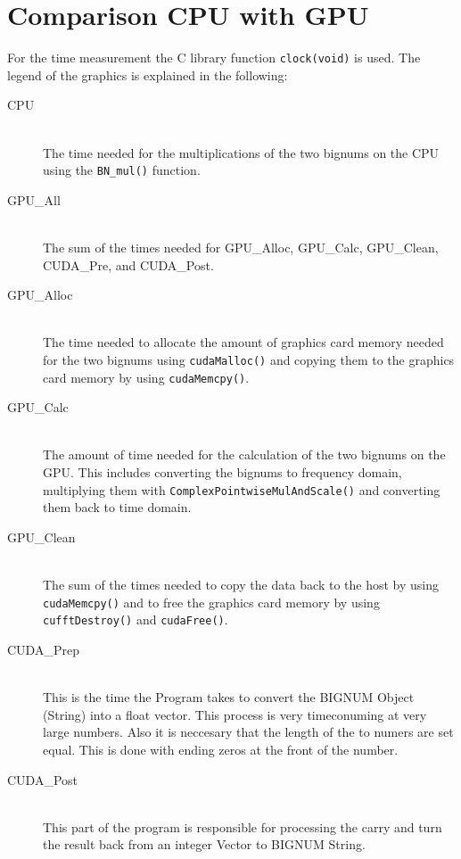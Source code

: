 \documentclass[12pt,a4paper]{article}
\begin{document}
\section{Comparison CPU with GPU}
For the time measurement the C library function \texttt{clock(void)} is used. The legend of the graphics is explained in the following:
\begin{description}
\item[CPU]\hfill \\
The time needed for the multiplications of the two bignums on the CPU using the \texttt{BN_mul()} function.
\item[GPU\_All]\hfill \\ 
The sum of the times needed for GPU\_Alloc, GPU\_Calc, GPU\_Clean, CUDA\_Pre, and CUDA\_Post.
\item[GPU\_Alloc]\hfill \\ 
The time needed to allocate the amount of graphics card memory needed for the two bignums using \texttt{cudaMalloc()} and copying them to the graphics card memory by using \texttt{cudaMemcpy()}.
\item[GPU\_Calc]\hfill \\ 
The amount of time needed for the calculation of the two bignums on the GPU. This includes converting the bignums to frequency domain, multiplying them with \texttt{ComplexPointwiseMulAndScale()} and converting them back to time domain.
\item[GPU\_Clean]\hfill \\ 
The sum of the times needed to copy the data back to the host by using \texttt{cudaMemcpy()} and to free the graphics card memory by using \texttt{cufftDestroy()} and \texttt{cudaFree()}.
\item[CUDA\_Prep]\hfill \\ 
This is the time the Program takes to convert the BIGNUM Object (String) into a float vector. This process is very timeconuming at very large numbers. Also it is neccesary that the length of the to numers are set equal. This is done with ending zeros at the front of the number.
\item[CUDA\_Post]\hfill \\ 
This part of the program is responsible for processing the carry and turn the result back from an integer Vector to BIGNUM String.


\end{description}
\end{document}
